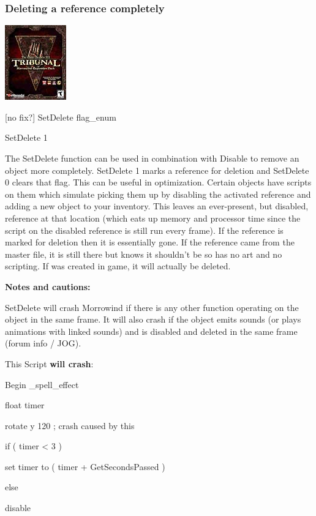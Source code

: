 \documentclass[
]{article}
\begin{document}
\hypertarget{deleting-a-reference-completely}{%
\subsubsection{Deleting a reference
completely}\label{deleting-a-reference-completely}}

\includegraphics{media/image6.png}

{[}no fix?{]} SetDelete flag\_enum

SetDelete 1

The SetDelete function can be used in combination with Disable to remove
an object more completely. SetDelete 1 marks a reference for deletion
and SetDelete 0 clears that flag. This can be useful in optimization.
Certain objects have scripts on them which simulate picking them up by
disabling the activated reference and adding a new object to your
inventory. This leaves an ever-present, but disabled, reference at that
location (which eats up memory and processor time since the script on
the disabled reference is still run every frame). If the reference is
marked for deletion then it is essentially gone. If the reference came
from the master file, it is still there but knows it shouldn't be so has
no art and no scripting. If was created in game, it will actually be
deleted.

\textbf{Notes and cautions:}

SetDelete will crash Morrowind if there is any other function operating
on the object in the same frame. It will also crash if the object emits
sounds (or plays animations with linked sounds) and is disabled and
deleted in the same frame (forum info / JOG).

This Script \textbf{will crash}:

Begin \_spell\_effect

float timer

rotate y 120 ; crash caused by this

if ( timer \textless{} 3 )

set timer to ( timer + GetSecondsPassed )

else

disable
\end{document}
